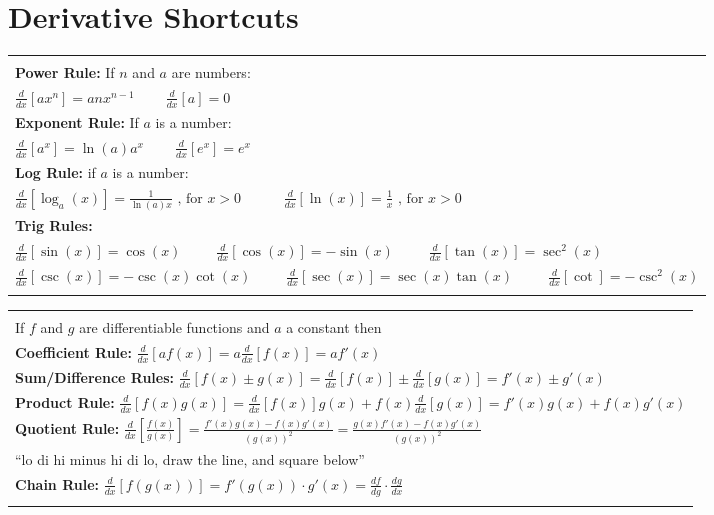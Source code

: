 \documentclass[12pt]{report}
\newenvironment{boxe}
    {\begin{center}
    \begin{tabular}{|p{0.9\textwidth}|}
    \hline\\
    }
    { 
    \\\\\hline
    \end{tabular} 
    \end{center}
    }
\begin{document}
\section*{Derivative Shortcuts}
\begin{boxe}
    \textbf{Power Rule: } If $n$ and $a$ are numbers:\\
    $\displaystyle{\frac{d}{dx}\left[ax^{n}\right]=anx^{n-1}}
    \;\;\;\;\;\;\;\;
    \displaystyle{\frac{d}{dx}\left[a \right]=0}$\\
    \textbf{Exponent Rule: } If $a$ is a number:\\
    $\displaystyle{\frac{d}{dx}\left[a^x\right]=\ln(a)a^x}
    \;\;\;\;\;\;\;\;
    \displaystyle{\frac{d}{dx}\left[e^x \right]=e^x}$\\

    \textbf{Log Rule: } if $a$ is a number:\\
    $\displaystyle{\frac{d}{dx}\left[\log_a(x)\right]=\frac{1}{\ln(a)x}}\text{ , for }x>0
    \;\;\;\;\;\;\;\;\;\;\;
    \displaystyle{\frac{d}{dx}\left[\ln(x)\right]=\frac{1}{x}}\text{ , for }x>0$\\

    \textbf{Trig Rules: }\\
    $\displaystyle{\frac{d}{dx}\left[\sin(x) \right]= \cos(x)}\;\;\;\;\;\;\;\;\; \displaystyle{\frac{d}{dx}\left[ \cos(x)\right]= -\sin(x)}\;\;\;\;\;\;\;\;\;\displaystyle{\frac{d}{dx}\left[\tan(x) \right]= \sec^2(x)}$\\
    \vspace{.05pt}
    $\displaystyle{\frac{d}{dx}\left[ \csc(x)\right]= -\csc(x)\cot(x)} \;\;\;\;\;\;\;\;\;\displaystyle{\frac{d}{dx}\left[ \sec(x)\right]= \sec(x)\tan(x)}\;\;\;\;\;\;\;\;\; \displaystyle{\frac{d}{dx}\left[ \cot\right]= -\csc^2(x)}$
    \end{boxe}

    \begin{boxe}
        If $f$ and $g$ are differentiable functions and $a$ a constant then\\
        \textbf{Coefficient Rule: } $\displaystyle{\frac{d}{dx}\left[af(x) \right]=a\frac{d}{dx}\left[f(x) \right]=af'(x) }$\\
        \textbf{Sum/Difference Rules: } $\displaystyle{\frac{d}{dx}\left[f(x)\pm g(x) \right]=\frac{d}{dx}\left[f(x) \right]\pm \frac{d}{dx}\left[g(x) \right]=f'(x)\pm g'(x) }$\\
        \textbf{Product Rule: } $\displaystyle{\frac{d}{dx}\left[f(x) g(x) \right]=\frac{d}{dx}\left[f(x) \right]g(x)+ f(x)\frac{d}{dx}\left[g(x) \right]=f'(x)g(x)+ f(x)g'(x) }$\\
        \vspace{.1pt}
        \textbf{Quotient Rule: } $\displaystyle{\frac{d}{dx}\left[\frac{f(x)}{g(x)} \right]=\frac{f'(x)g(x)- f(x)g'(x) }{(g(x))^2}=\frac{g(x)f'(x)- f(x)g'(x) }{(g(x))^2}}$\\
        ``lo di hi minus hi di lo, draw the line, and square below''\\
        \textbf{Chain Rule: } $\displaystyle{\frac{d}{dx}\left[f(g(x)) \right]=f'(g(x))\cdot g'(x)=\frac{df}{dg}\cdot\frac{dg}{dx}}$
\end{boxe}
\end{document}
